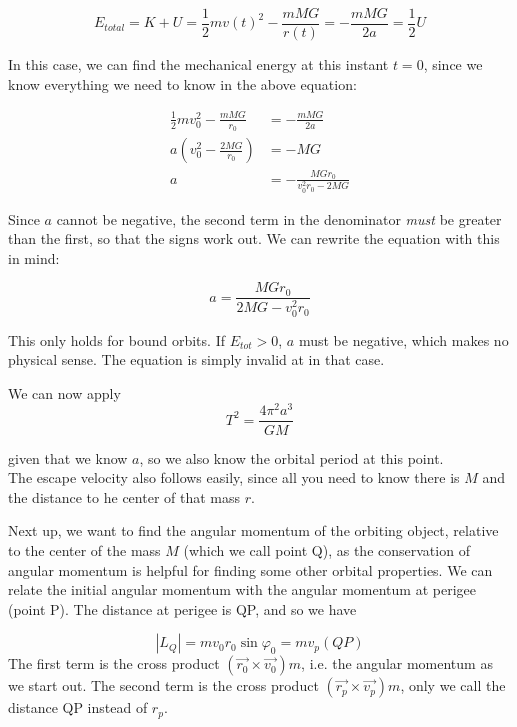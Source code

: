 \documentclass[8.01x]{subfiles}
\begin{document}
\begin{equation}
E_{total} = K + U = \frac{1}{2} m v(t)^2 - \frac{m M G}{r(t)} = - \frac{m M G}{2a} = \frac{1}{2} U
\end{equation}

In this case, we can find the mechanical energy at this instant $t = 0$, since we know everything we need to know in the above equation:

\begin{align}
\frac{1}{2} m v_0^2 - \frac{m M G}{r_0} &= -\frac{m M G}{2a}\\
a \left(v_0^2 - \frac{2 M G}{r_0}\right) &= -M G\\
a &= -\frac{M G r_0}{v_0^2 r_0 - 2 M G}
\end{align}

Since $a$ cannot be negative, the second term in the denominator \emph{must} be greater than the first, so that the signs work out. We can rewrite the equation with this in mind:

\begin{equation}
a = \frac{M G r_0}{2 M G - v_0^2 r_0}
\end{equation}

This only holds for bound orbits. If $E_{tot} > 0$, $a$ must be negative, which makes no physical sense. The equation is simply invalid at in that case.

We can now apply
\begin{equation}
T^2 = \frac{4 \pi^2 a^3}{G M}
\end{equation}

given that we know $a$, so we also know the orbital period at this point.\\
The escape velocity also follows easily, since all you need to know there is $M$ and the distance to he center of that mass $r$.

Next up, we want to find the angular momentum of the orbiting object, relative to the center of the mass $M$ (which we call point Q), as the conservation of angular momentum is helpful for finding some other orbital properties. We can relate the initial angular momentum with the angular momentum at perigee (point P). The distance at perigee is QP, and so we have

\begin{equation}
|L_Q| = m v_0 r_0 \sin \varphi_0 = m v_p (QP)
\end{equation}
The first term is the cross product $(\vec{r_0} \times \vec {v_0}) m$, i.e. the angular momentum as we start out. The second term is the cross product $(\vec{r_p} \times \vec{v_p}) m$, only we call the distance QP instead of $r_p$.
\end{document}
